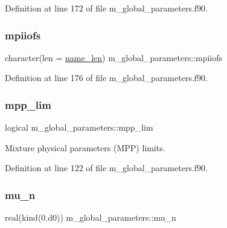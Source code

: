 Definition at line 172 of file m\+\_\+global\+\_\+parameters.\+f90.

\mbox{\label{namespacem__global__parameters_ad4713c1e89eaa8fac3bb2181ba87b192}} 
\subsubsection{\texorpdfstring{mpiiofs}{mpiiofs}}
{\footnotesize\ttfamily character(len = \hyperlink{namespacem__global__parameters_ac8252b115e717c6f1c8595be6f897df7}{name\+\_\+len}) m\+\_\+global\+\_\+parameters\+::mpiiofs}



Definition at line 176 of file m\+\_\+global\+\_\+parameters.\+f90.

\mbox{\label{namespacem__global__parameters_adc35ba450a192812db36f1d6659d64e6}} 
\subsubsection{\texorpdfstring{mpp\+\_\+lim}{mpp\_lim}}
{\footnotesize\ttfamily logical m\+\_\+global\+\_\+parameters\+::mpp\+\_\+lim}



Mixture physical parameters (M\+PP) limits. 



Definition at line 122 of file m\+\_\+global\+\_\+parameters.\+f90.

\mbox{\label{namespacem__global__parameters_a7829126e47034f2e39153efa144bc17b}} 
\subsubsection{\texorpdfstring{mu\+\_\+n}{mu\_n}}
{\footnotesize\ttfamily real(kind(0.d0)) m\+\_\+global\+\_\+parameters\+::mu\+\_\+n}



